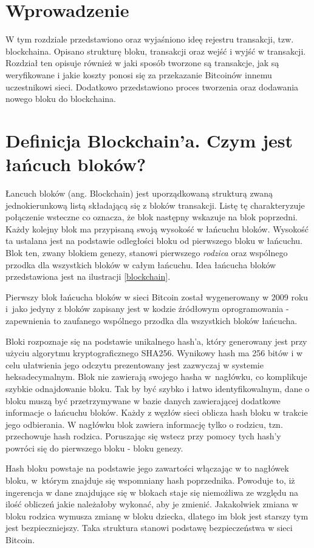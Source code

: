 \documentclass[12pt, twoside, final, openany]{mgr}
\begin{document}
\section{Wprowadzenie}
\indent W tym rozdziale przedstawiono oraz wyjaśniono ideę rejestru transakcji, tzw. blockchaina. Opisano strukturę bloku, transakcji oraz wejść i wyjść w transakcji. Rozdział ten opisuje również w jaki sposób tworzone są transakcje, jak są weryfikowane i jakie koszty ponosi się za przekazanie Bitcoinów innemu uczestnikowi sieci. Dodatkowo przedstawiono proces tworzenia oraz dodawania nowego bloku do blockchaina. 

\section{Definicja Blockchain'a. Czym jest łańcuch bloków?}
\indent Łancuch bloków (ang. Blockchain) jest uporządkowaną strukturą zwaną jednokierunkową listą składającą się z bloków transakcji. Listę tę charakteryzuje połączenie wsteczne co oznacza, że blok następny wskazuje na blok poprzedni. Każdy kolejny blok ma przypisaną swoją wysokość w łańcuchu bloków. Wysokość ta ustalana jest na podstawie odległości bloku od pierwszego bloku w łańcuchu. Blok ten, zwany blokiem genezy, stanowi pierwszego \textit{rodzica} oraz wspólnego przodka dla wszystkich bloków w całym łańcuchu\cite{BitcoinAndCryptocurrencyTechnologies}. Idea łańcucha bloków przedstawiona jest na ilustracji \ref{blockchain}.

\indent Pierwszy blok łańcucha bloków w sieci Bitcoin został wygenerowany w 2009 roku i~jako jedyny z bloków zapisany jest w kodzie źródłowym oprogramowania - zapewnienia to zaufanego wspólnego przodka dla wszystkich bloków łańcucha.

\indent Bloki rozpoznaje się na podstawie unikalnego hash'a, który generowany jest przy użyciu algorytmu kryptograficznego SHA256. Wynikowy hash ma 256 bitów i w celu ułatwienia jego odczytu prezentowany jest zazwyczaj w systemie heksadecymalnym. Blok nie zawierają swojego hasha w~nagłówku, co komplikuje szybkie odnajdowanie bloku. Tak by być szybko i łatwo identyfikowalnym, dane o bloku muszą być przetrzymywane w bazie danych zawierającej dodatkowe informacje o łańcuchu bloków. Każdy z węzłów sieci oblicza hash bloku w trakcie jego odbierania. W nagłówku blok zawiera informację tylko o rodzicu, tzn. przechowuje hash rodzica. Poruszając się wstecz przy pomocy tych hash'y powróci się do pierwszego bloku - bloku genezy. 

\indent Hash bloku powstaje na podstawie jego zawartości włączając w to nagłówek bloku, w~którym znajduje się wspomniany hash poprzednika. Powoduje to, iż ingerencja w dane znajdujące się w blokach staje się niemożliwa ze względu na ilość obliczeń jakie należałoby wykonać, aby je zmienić. Jakakolwiek zmiana w bloku rodzica wymusza zmianę w bloku dziecka, dlatego im blok jest starszy tym jest bezpieczniejszy. Taka struktura stanowi podstawę bezpieczeństwa w sieci Bitcoin.
\end{document}
